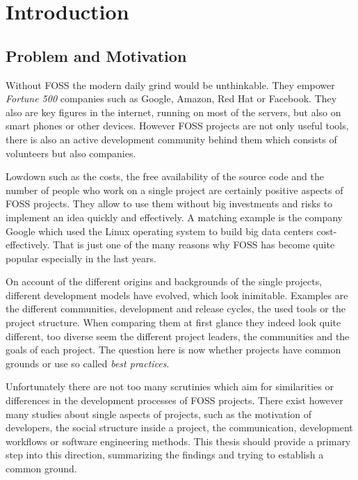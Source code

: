 \chapter{Introduction} %
\label{chap:introduction}

\section{Problem and Motivation} %

Without \ac{FOSS} the modern daily grind would be unthinkable. They empower
\emph{Fortune 500} companies such as Google, Amazon, Red Hat or Facebook. They
also are key figures in the internet, running on most of the servers, but also
on smart phones or other devices. However \ac{FOSS} projects are not only
useful tools, there is also an active development community behind them which
consists of volunteers but also companies.

Lowdown such as the costs, the free availability of the source code and the
number of people who work on a single project are certainly positive aspects of
\ac{FOSS} projects. They allow to use them without big investments and risks to
implement an idea quickly and effectively. A matching example is the company
Google which used the Linux operating system to build big data centers
cost-effectively. That is just one of the many reasons why \ac{FOSS} has become
quite popular especially in the last years.

On account of the different origins and backgrounds of the single projects,
different development models have evolved, which look inimitable. Examples are
the different communities, development and release cycles, the used tools or
the project structure. When comparing them at first glance they indeed look
quite different, too diverse seem the different project leaders, the
communities and the goals of each project. The question here is now whether
projects have common grounds or use so called \emph{best practices}.

Unfortunately there are not too many scrutinies which aim for similarities or
differences in the development processes of \ac{FOSS} projects. There exist
however many studies about single aspects of projects, such as the motivation
of developers, the social structure inside a project, the communication,
development workflows or software engineering methods. This thesis should
provide a primary step into this direction, summarizing the findings and trying
to establish a common ground.

